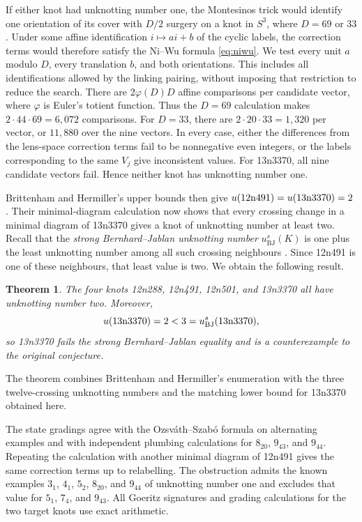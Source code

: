 \documentclass[12pt, oneside]{amsart}
\newtheorem{theorem}{Theorem}[section]
\newcommand{\kn}[2]{\textup{#1#2}}
\begin{document}
If either knot had unknotting number one, the Montesinos trick would identify
one orientation of its cover with $D/2$ surgery on a knot in $S^3$, where
$D=69$ or $33$. Under some affine identification $i\mapsto ai+b$ of the cyclic
labels, the correction terms would therefore satisfy the Ni--Wu formula
\eqref{eq:niwu}. We test every unit $a$ modulo $D$, every translation $b$, and
both orientations. This includes all identifications allowed by the linking
pairing, without imposing that restriction to reduce the search. There are
$2\varphi(D)D$ affine comparisons per candidate vector, where $\varphi$ is
Euler's totient function. Thus the $D=69$ calculation makes
$2\cdot44\cdot69=6{,}072$ comparisons. For $D=33$, there are
$2\cdot20\cdot33=1{,}320$ per vector, or $11{,}880$ over the nine vectors.
In every case, either the differences from the lens-space correction
terms fail to be nonnegative even integers, or the labels corresponding to the
same $V_j$ give inconsistent values. For \kn{13n}{3370}, all nine candidate
vectors fail. Hence neither knot has unknotting number one.

Brittenham and Hermiller's upper bounds then give
$u(\kn{12n}{491})=u(\kn{13n}{3370})=2$
\cite[Thm.~1.3(a)--(b)]{BH1705}. Their minimal-diagram calculation now shows
that every crossing change in a minimal diagram of \kn{13n}{3370} gives a knot
of unknotting number at least two. Recall that the \emph{strong Bernhard--Jablan
unknotting number} $u^s_{\mathrm{BJ}}(K)$ is one plus the least unknotting number
among all such crossing neighbours \cite{BH1705}. Since \kn{12n}{491} is one of
these neighbours, that least value is two. We obtain the following result.

\begin{theorem}\label{thm:bj-counterexample}
The four knots \kn{12n}{288}, \kn{12n}{491}, \kn{12n}{501}, and
\kn{13n}{3370} all have unknotting number two. Moreover,
\[
    u(\kn{13n}{3370})=2<3=u^s_{\mathrm{BJ}}(\kn{13n}{3370}),
\]
so \kn{13n}{3370} fails the strong Bernhard--Jablan equality and is a
counterexample to the original conjecture.
\end{theorem}

The theorem combines Brittenham and Hermiller's enumeration
\cite[Thm.~1.3(c)]{BH1705} with the three twelve-crossing unknotting numbers
and the matching lower bound for \kn{13n}{3370} obtained here.

The state gradings agree with the Ozsv\'ath--Szab\'o formula
on alternating examples and with independent plumbing calculations for $8_{20}$,
$9_{43}$, and $9_{44}$. Repeating the calculation with another minimal diagram of
\kn{12n}{491} gives the same correction terms up to relabelling.
The obstruction admits the known examples
$3_1$, $4_1$, $5_2$, $8_{20}$, and $9_{44}$ of unknotting number one and excludes
that value for $5_1$, $7_4$, and $9_{43}$. All Goeritz signatures and grading
calculations for the two target knots use exact arithmetic.
\end{document}
